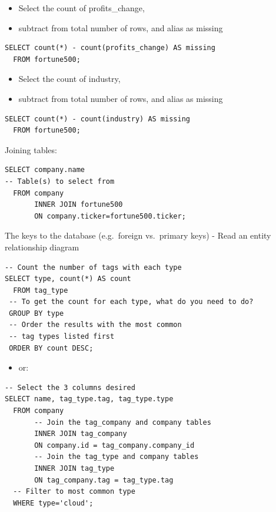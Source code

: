 \documentclass[]{book}
\providecommand{\tightlist}{%
  \setlength{\itemsep}{0pt}\setlength{\parskip}{0pt}}
\begin{document}
\begin{itemize}
\tightlist
\item
  Select the count of profits\_change,
\item
  subtract from total number of rows, and alias as missing
\end{itemize}

\begin{verbatim}
SELECT count(*) - count(profits_change) AS missing
  FROM fortune500;
\end{verbatim}

\begin{itemize}
\tightlist
\item
  Select the count of industry,
\item
  subtract from total number of rows, and alias as missing
\end{itemize}

\begin{verbatim}
SELECT count(*) - count(industry) AS missing
  FROM fortune500;
\end{verbatim}

Joining tables:

\begin{verbatim}
SELECT company.name 
-- Table(s) to select from
  FROM company 
       INNER JOIN fortune500 
       ON company.ticker=fortune500.ticker;
\end{verbatim}

The keys to the database (e.g.~foreign vs.~primary keys)
- Read an entity relationship diagram

\begin{verbatim}
-- Count the number of tags with each type
SELECT type, count(*) AS count
  FROM tag_type
 -- To get the count for each type, what do you need to do?
 GROUP BY type
 -- Order the results with the most common
 -- tag types listed first
 ORDER BY count DESC;
\end{verbatim}

\begin{itemize}
\tightlist
\item
  or:
\end{itemize}

\begin{verbatim}
-- Select the 3 columns desired
SELECT name, tag_type.tag, tag_type.type
  FROM company
  	   -- Join the tag_company and company tables
       INNER JOIN tag_company 
       ON company.id = tag_company.company_id
       -- Join the tag_type and company tables
       INNER JOIN tag_type
       ON tag_company.tag = tag_type.tag
  -- Filter to most common type
  WHERE type='cloud';
\end{verbatim}
\end{document}
